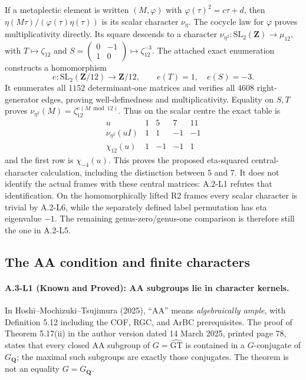 If a metaplectic element is written $(M,\varphi)$ with
$\varphi(\tau)^2=c\tau+d$, then
$\eta(M\tau)/(\varphi(\tau)\eta(\tau))$ is its scalar
character $\nu_\eta$. The cocycle law for $\varphi$ proves
multiplicativity directly. Its square descends to a character
$\nu_{\eta^2}:\mathrm{SL}_2(\mathbf Z)\to\mu_{12}$,
with $T\mapsto\zeta_{12}$ and
$S=\left(\begin{smallmatrix}0&-1\\1&0\end{smallmatrix}\right)
\mapsto\zeta_{12}^{-3}$.
The attached exact enumeration constructs a homomorphism
\[
 e:\mathrm{SL}_2(\mathbf Z/12)\longrightarrow\mathbf Z/12,
 \qquad e(T)=1,\quad e(S)=-3.
\]
It enumerates all $1152$ determinant-one matrices and verifies all
$4608$ right-generator edges, proving well-definedness and
multiplicativity. Equality on $S,T$ proves
$\nu_{\eta^2}(M)=\zeta_{12}^{e(M\bmod12)}$. Thus on the scalar
centre the exact table is
\[
\begin{array}{c|rrrr}
 u&1&5&7&11\\\hline
 \nu_{\eta^2}(uI)&1&1&-1&-1\\
 \chi_{12}(u)&1&-1&-1&1
\end{array}
\]
and the first row is $\chi_{-4}(u)$. This proves the proposed
eta-squared central-character calculation, including the distinction
between $5$ and $7$. It does not identify the actual frames with
these central matrices: A.2-L1 refutes that identification. On the
homomorphically lifted R2 frames every scalar character is trivial
by A.2-L6, while the separately defined label permutation has eta
eigenvalue $-1$. The remaining genus-zero/genus-one comparison is
therefore still the one in A.2-L5.

\subsection{The AA condition and finite characters}

\paragraph{A.3-L1 (Known and Proved): AA subgroups lie in character kernels.}
In Hoshi--Mochizuki--Tsujimura (2025), ``AA'' means
\emph{algebraically ample}, with Definition 5.12 including the
COF, RGC, and ArBC prerequisites.  The proof of Theorem 5.17(ii)
in the author version dated 14 March 2025, printed page 78,
states that every closed AA subgroup of
$G=\widehat{\mathrm{GT}}$ is contained in a $G$-conjugate of
$G_{\mathbf Q}$; the maximal such subgroups are exactly those
conjugates.  The theorem is not an equality $G=G_{\mathbf Q}$.

